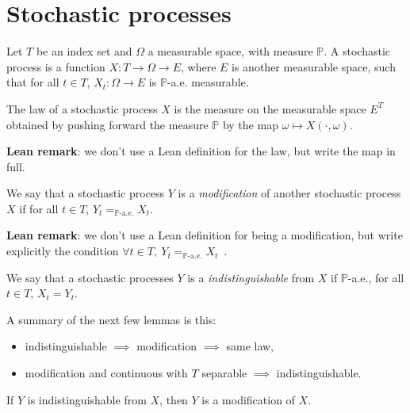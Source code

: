 \chapter{Stochastic processes}
\label{chap:process}

Let $T$ be an index set and $\Omega$ a measurable space, with measure $\mathbb{P}$.
A stochastic process is a function $X : T \to \Omega \to E$, where $E$ is another measurable space, such that for all $t \in T$, $X_t : \Omega \to E$ is $\mathbb{P}$-a.e. measurable.


\begin{definition}\label{def:processLaw}
  \leanok
The law of a stochastic process $X$ is the measure on the measurable space $E^T$ obtained by pushing forward the measure $\mathbb{P}$ by the map $\omega \mapsto X(\cdot, \omega)$.
\end{definition}

\textbf{Lean remark}: we don't use a Lean definition for the law, but write the map in full.

\begin{definition}[Modification]\label{def:modification}
  \leanok
We say that a stochastic process $Y$ is a \emph{modification} of another stochastic process $X$ if for all $t \in T$, $Y_t =_{\mathbb{P}\text{-a.e.}} X_t$.
\end{definition}

\textbf{Lean remark}: we don't use a Lean definition for being a modification, but write explicitly the condition $\forall t \in T,\ Y_t =_{\mathbb{P}\text{-a.e.}} X_t$~.

\begin{definition}[Indistinguishable]\label{def:indistinguishable}
  \leanok
We say that a stochastic processes $Y$ is a \emph{indistinguishable} from $X$ if $\mathbb{P}$-a.e., for all $t \in T$, $X_t = Y_t$.
\end{definition}

A summary of the next few lemmas is this:
\begin{itemize}
  \item indistinguishable $\implies$ modification $\implies$ same law,
  \item modification and continuous with $T$ separable $\implies$ indistinguishable.
\end{itemize}


\begin{lemma}\label{lem:Indistinguishable.Modification}
  \leanok
If $Y$ is indistinguishable from $X$, then $Y$ is a modification of $X$.
\end{lemma}

